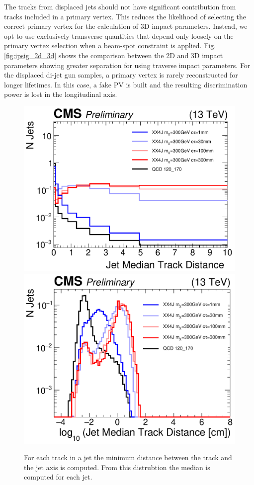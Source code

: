 The tracks from displaced jets should not have significant contribution from tracks included in a primary vertex. This reduces the likelihood of selecting the correct
primary vertex for the calculation of 3D impact parameters. Instead, we opt to use exclusively transverse quantities that depend only loosely
on the primary vertex selection when a beam-spot constraint is applied.  Fig. \ref{fig:ipsig_2d_3d} shows the comparison between the 2D and 3D
impact parameters showing greater separation for using traverse impact parameters. For the displaced di-jet gun samples, a primary vertex
is rarely reconstructed for longer lifetimes. In this case, a fake PV is built and the resulting discrimination power is lost in the longitudinal
axis. 

\begin{figure}
\begin{center}
\includegraphics[width=.45\textwidth]{figures/an_jetid/VTX_MATCH_IP/XX4J_jetMedianDistance}
\includegraphics[width=.45\textwidth]{figures/an_jetid/VTX_MATCH_IP/XX4J_log_jetMedianTrackDist}
\end{center}
\caption{For each track in a jet the minimum distance between the track and the jet axis is computed. From this distrubtion
the median is computed for each jet.}
\label{fig:jetDistance}
\end{figure}


